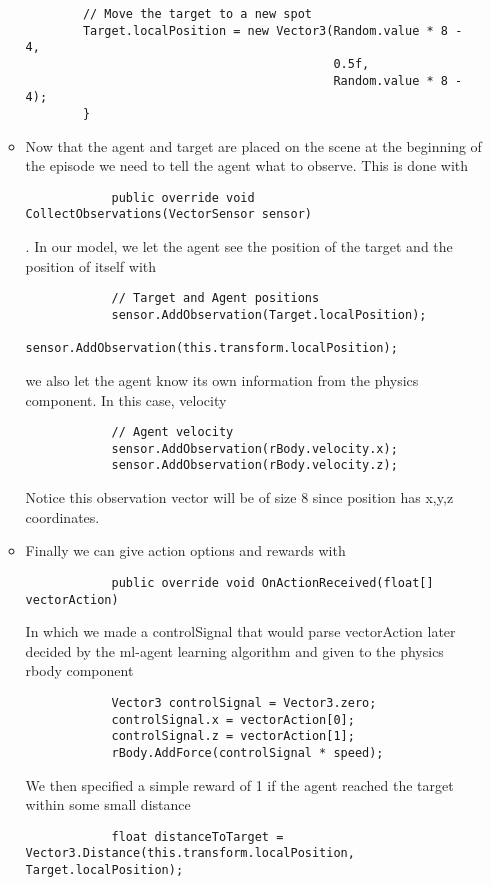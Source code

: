 \documentclass[11pt,fleqn,openany]{book} %
\begin{document}
\begin{itemize}
\begin{itemize}
\begin{verbatim}
        // Move the target to a new spot
        Target.localPosition = new Vector3(Random.value * 8 - 4,
                                           0.5f,
                                           Random.value * 8 - 4);
        }
        \end{verbatim}
        \item Now that the agent and target are placed on the scene at the beginning of the episode we need to tell the agent what to observe. This is done with \begin{verbatim}
            public override void CollectObservations(VectorSensor sensor)
        \end{verbatim}. In our model, we let the agent see the position of the target and the position of itself with \begin{verbatim}
            // Target and Agent positions
            sensor.AddObservation(Target.localPosition);
            sensor.AddObservation(this.transform.localPosition);
        \end{verbatim} we also let the agent know its own information from the physics component. In this case, velocity \begin{verbatim}
            // Agent velocity
            sensor.AddObservation(rBody.velocity.x);
            sensor.AddObservation(rBody.velocity.z);
        \end{verbatim} Notice this observation vector will be of size 8 since position has x,y,z coordinates.
        \item Finally we can give action options and rewards with \begin{verbatim}
            public override void OnActionReceived(float[] vectorAction)
        \end{verbatim} In which we made a controlSignal that would parse vectorAction later decided by the ml-agent learning algorithm and given to the physics rbody component \begin{verbatim}
            Vector3 controlSignal = Vector3.zero;
            controlSignal.x = vectorAction[0];
            controlSignal.z = vectorAction[1];
            rBody.AddForce(controlSignal * speed);
        \end{verbatim} We then specified a simple reward of 1 if the agent reached the target within some small distance \begin{verbatim}
            float distanceToTarget = Vector3.Distance(this.transform.localPosition, Target.localPosition);


\end{verbatim}
\end{itemize}
\end{itemize}
\end{document}
